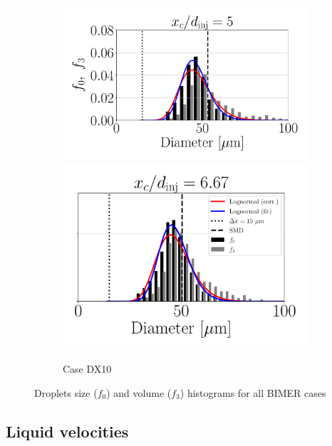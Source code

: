 \begin{figure}[ht]
\begin{subfigure}[b]{1.1\textwidth}
	\flushleft
   \includegraphics[scale=0.35]{./part3_applications/figures_ch8_resolved/SPRAY_characterization/histograms_size_volume/DX15_xD05p00_histograms}
   \includegraphics[scale=0.35]{./part3_applications/figures_ch8_resolved/SPRAY_characterization/histograms_size_volume/DX15_xD06p67_histograms}
	\caption{Case DX10}
\end{subfigure}

   \caption{Droplets size ($f_0$) and volume ($f_3$) histograms for all BIMER cases}
\label{fig:ch8_jicf_size_volume_histograms_all}
\end{figure}



\subsection{Liquid velocities}



